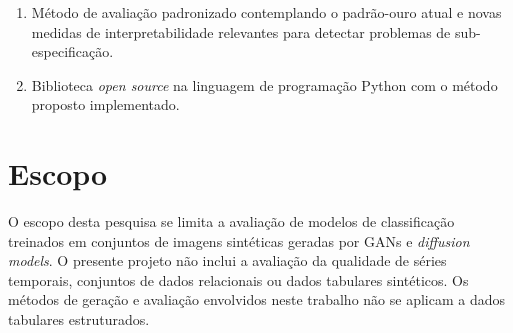 \begin{enumerate}
    \item Método de avaliação padronizado contemplando o padrão-ouro atual e novas medidas de interpretabilidade relevantes para detectar problemas de sub-especificação.
    \item Biblioteca \textit{open source} na linguagem de programação Python com o método proposto implementado.
\end{enumerate}


\section{Escopo}

O escopo desta pesquisa se limita a avaliação de modelos de classificação treinados em conjuntos de imagens sintéticas geradas por GANs e \textit{diffusion models}. O presente projeto não inclui a avaliação da qualidade de séries temporais, conjuntos de dados relacionais ou dados tabulares sintéticos. Os métodos de geração e avaliação envolvidos neste trabalho não se aplicam a dados tabulares estruturados.
